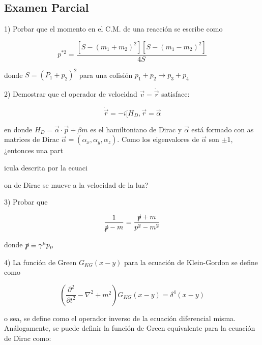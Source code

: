 \documentclass{report}
\begin{document}

\subsection{Examen Parcial}

\begin{itemize}

\item 1) Porbar que el momento en el C.M. de una reacción se escribe como

\begin{equation}
p^{*2} = \frac{[S- (m_1 + m_2 )^2 ] [S-(m_1 - m_2 )^2 ]}{4S}
\end{equation}

donde $S=(P_1 + p_2 )^2$ para una colisión $p_1 + p_2 \rightarrow p_3 + p_4 $

\item 2) Demostrar que el operador de velocidad $\vec{v} = \dot{\vec{r}}$ satisface:

\begin{equation}
\dot{\vec{r}} = -i [H_D , \vec{r}= \vec{\alpha}
\end{equation}

en donde $H_D =\vec{\alpha}\cdot \vec{p}+\beta m$ es el hamiltoniano de Dirac y $\vec{\alpha}$ está formado con as matrices de Dirac $\vec{\alpha} =(\alpha_x , \alpha_y , \alpha_z )$. Como los eigenvalores de $\vec{\alpha}$ son $\pm 1$,¿entonces una part{icula descrita por la ecuaci{on de Dirac se mueve a la velocidad de la luz?

\item 3) Probar que

\begin{equation}
\frac{1}{\slashed{p}-m} = \frac{\slashed{p} +m}{p^2 - m^2 }
\end{equation}

donde $\slashed{p} \equiv \gamma^{\mu} p_{\mu}$

\item 4) La función de Green $G_{KG} (x-y)$ para la ecuación de Klein-Gordon se define como

\begin{equation}
(\frac{\partial ^2}{\partial t^2 } -\nabla ^2 + m^2 ) G_{KG} (x-y) = \delta ^{4} (x-y)
\end{equation}


o sea, se define como el operador inverso de la ecuación diferencial misma. Análogamente, se puede definir la función de Green equivalente para la ecuación de Dirac como:

}}
\end{itemize}
\end{document}
